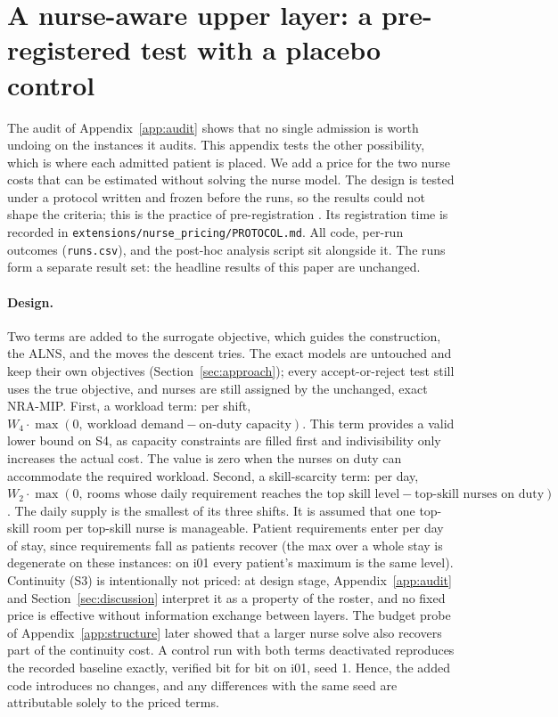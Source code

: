 \documentclass[11pt]{article}
\newcommand{\Sc}[1]{\textsf{S#1}}
\begin{document}
	\section{A nurse-aware upper layer: a pre-registered test with a placebo control}\label{app:pricing}
	The audit of Appendix~\ref{app:audit} shows that no single admission is worth undoing on the instances it audits. This appendix tests the other possibility, which is where each admitted patient is placed. We add a price for the two nurse costs that can be estimated without solving the nurse model. The design is tested under a protocol written and frozen before the runs, so the results could not shape the criteria; this is the practice of pre-registration \citep{nosek2018}. Its registration time is recorded in \texttt{extensions/nurse\_pricing/PROTOCOL.md}. All code, per-run outcomes (\texttt{runs.csv}), and the post-hoc analysis script sit alongside it. The runs form a separate result set: the headline results of this paper are
	unchanged.

	\paragraph{Design.} Two terms are added to the surrogate objective, which guides the construction, the ALNS, and the moves the descent tries. The exact models are untouched and keep their own objectives (Section~\ref{sec:approach});
	every accept-or-reject test still uses the true objective, and nurses are still assigned by the unchanged, exact NRA-MIP. First, a workload term: per shift, $W_4\cdot\max(0,\ \text{workload demand} - \text{on-duty capacity})$. This term provides a valid lower bound on \Sc4, as capacity constraints are filled first and indivisibility only increases the actual cost. The value is zero when the nurses on duty can accommodate the required workload. Second, a skill-scarcity term: per day,
	$W_2\cdot\max(0,\ \text{rooms whose daily requirement reaches the top skill level} -
	\text{top-skill nurses on duty})$. The daily supply is the smallest of its three shifts. It is assumed that one top-skill room per top-skill nurse is manageable. Patient requirements enter
	per day of stay, since requirements fall as patients recover
	(the max over a whole stay is degenerate on these instances: on i01 every patient's maximum is the same level). Continuity (\Sc3) is intentionally
	not priced: at design stage, Appendix~\ref{app:audit} and Section~\ref{sec:discussion} interpret it as a property of the roster, and no fixed price is effective without information exchange between layers. The budget probe
	of Appendix~\ref{app:structure} later showed that a larger nurse solve also recovers part of the
	continuity cost. A control run with both terms deactivated reproduces the recorded baseline exactly, verified bit for bit on i01, seed 1. Hence, the added code introduces no changes, and any differences with the same seed are attributable solely to the priced terms.
\end{document}
